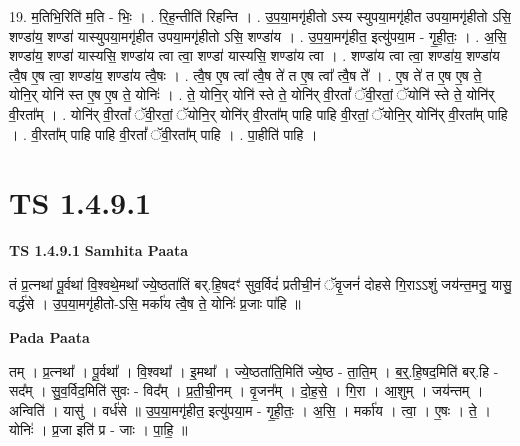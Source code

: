 \documentclass[17pt]{extarticle}
\begin{document}
19. म॒तिभि॒रिति॑ म॒ति - भिः॒ । . रि॒ह॒न्तीति॑ रिहन्ति । . उ॒प॒या॒मगृ॑हीतो ऽस्य स्युपया॒मगृ॑हीत उपया॒मगृ॑हीतो ऽसि॒ शण्डा॑य॒ शण्डा॑ यास्युपया॒मगृ॑हीत उपया॒मगृ॑हीतो ऽसि॒ शण्डा॑य । . उ॒प॒या॒मगृ॑हीत॒ इत्यु॑पया॒म - गृ॒ही॒तः॒ । . अ॒सि॒ शण्डा॑य॒ शण्डा॑ यास्यसि॒ शण्डा॑य त्वा त्वा॒ शण्डा॑ यास्यसि॒ शण्डा॑य त्वा । . शण्डा॑य त्वा त्वा॒ शण्डा॑य॒ शण्डा॑य त्वै॒ष ए॒ष त्वा॒ शण्डा॑य॒ शण्डा॑य त्वै॒षः । . त्वै॒ष ए॒ष त्वा᳚ त्वै॒ष ते॑ त ए॒ष त्वा᳚ त्वै॒ष ते᳚ । . ए॒ष ते॑ त ए॒ष ए॒ष ते॒ योनि॒र् योनि॑ स्त ए॒ष ए॒ष ते॒ योनिः॑ । . ते॒ योनि॒र् योनि॑ स्ते ते॒ योनि॑र् वी॒रतां᳚ ॅवी॒रतां॒ ॅयोनि॑ स्ते ते॒ योनि॑र् वी॒रता᳚म् । . योनि॑र् वी॒रतां᳚ ॅवी॒रतां॒ ॅयोनि॒र् योनि॑र् वी॒रता᳚म् पाहि पाहि वी॒रतां॒ ॅयोनि॒र् योनि॑र् वी॒रता᳚म् पाहि । . वी॒रता᳚म् पाहि पाहि वी॒रतां᳚ ॅवी॒रता᳚म् पाहि । . पा॒हीति॑ पाहि । \newline
\pagebreak
{}
\section*{ TS 1.4.9.1 }

\textbf{TS 1.4.9.1 } \newline
\textbf{Samhita Paata} \newline

तं प्र॒त्नथा॑ पू॒र्वथा॑ वि॒श्वथे॒मथा᳚ ज्ये॒ष्ठता॑तिं बर्.हि॒षदꣳ॑ सुव॒र्विदं॑ प्रतीची॒नं ॅवृ॒जनं॑ दोहसे गि॒राऽऽशुं जय॑न्त॒मनु॒ यासु॒ वर्द्ध॑से । उ॒प॒या॒मगृ॑हीतो-ऽसि॒ मर्का॑य त्वै॒ष ते॒ योनिः॑ प्र॒जाः पा॑हि ॥ \newline

\textbf{Pada Paata} \newline

तम् । प्र॒त्नथा᳚ । पू॒र्वथा᳚ । वि॒श्वथा᳚ । इ॒मथा᳚ । ज्ये॒ष्ठता॑ति॒मिति॑ ज्ये॒ष्ठ - ता॒ति॒म् । ब॒र्॒.हि॒षद॒मिति॑ बर्.हि - सद᳚म् । सु॒व॒र्विद॒मिति॑ सुवः - विद᳚म् । प्र॒ती॒ची॒नम् । वृ॒जन᳚म् । दो॒ह॒से॒ । गि॒रा । आ॒शुम् । जय॑न्तम् । अन्विति॑ । यासु॑ । वर्ध॑से ॥ उ॒प॒या॒मगृ॑हीत॒ इत्यु॑पया॒म - गृ॒ही॒तः॒ । अ॒सि॒ । मर्का॑य । त्वा॒ । ए॒षः । ते॒ । योनिः॑ । प्र॒जा इति॑ प्र - जाः । पा॒हि॒ ॥  \newline
\end{document}
